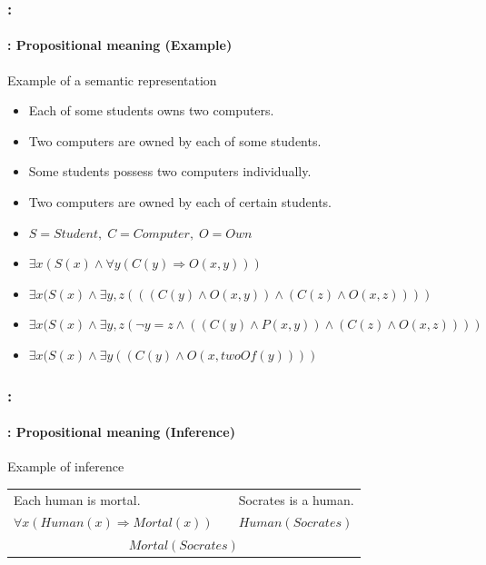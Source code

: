 \documentclass[xcolor=table]{beamer}
\begin{document}
\begin{frame}
	\frametitle{\insertshortsubtitle: \insertsection}
	\framesubtitle{\insertsubsection: Propositional meaning (Example)}

	\begin{exampleblock}{Example of a semantic representation}
		\begin{itemize}
			\item Each of some students owns two computers.
			\item Two computers are owned by each of some students.
			\item Some students possess two computers individually.
			\item Two computers are owned by each of certain students.
			\item $S = Student, \; C = Computer, \; O = Own$
			\item $\exists x (S(x) \wedge \forall y ( C(y) \Rightarrow O(x, y)) )$ \textcolor{red}{\XBox}
			\item $\exists x (S(x) \wedge \exists y, z (( (C(y) \wedge O(x, y) ) \wedge (C(z) \wedge O(x, z) ) ))$ \textcolor{red}{\XBox}
			\item $\exists x (S(x) \wedge \exists y, z (\neg y = z \wedge ( (C(y) \wedge P(x, y) ) \wedge (C(z) \wedge O(x, z) ) ))$ \textcolor{green}{\CheckedBox}
			\item $\exists x (S(x) \wedge \exists y ((C(y) \wedge O(x, twoOf(y)) ))$ \textcolor{green}{\CheckedBox}
		\end{itemize}
	\end{exampleblock}

\end{frame}

\begin{frame}
	\frametitle{\insertshortsubtitle: \insertsection}
	\framesubtitle{\insertsubsection: Propositional meaning (Inference)}

	\begin{exampleblock}{Example of inference}
		\centering
		\begin{tabular}{lll}
			Each human is mortal.  & & Socrates is a human. \\
			$\forall x (Human(x) \Rightarrow Mortal(x))$ && $Human(Socrates)$ \\
			\hline
			\multicolumn{3}{c}{$Mortal(Socrates)$}\\
		\end{tabular}
		
	\end{exampleblock}

\end{frame}
\end{document}
